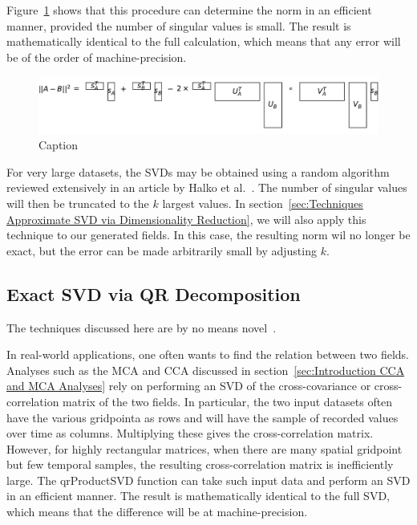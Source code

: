 \documentclass{acm_proc_article-sp}
\begin{document}
Figure~\ref{fig:normDifferenceFromUSVs} shows that this procedure can determine the norm in an efficient manner, provided the number of singular values is small. The result is mathematically identical to the full calculation, which means that any error will be of the order of machine-precision.

\begin{figure}[h]
\begin{center}
\includegraphics[width=\columnwidth]{Results/normDifferenceFromUSVs.pdf}
\caption[Small caption]{Caption}
\label{fig:normDifferenceFromUSVs}
\end{center}
\end{figure}
For very large datasets, the SVDs may be obtained using a random algorithm reviewed extensively in an article by Halko et al.~\cite{Halko2011}. The number of singular values will then be truncated to the $k$ largest values. In section~\ref{sec:Techniques Approximate SVD via Dimensionality Reduction}, we will also apply this technique to our generated fields. In this case, the resulting norm wil no longer be exact, but the error can be made arbitrarily small by adjusting $k$.

\subsection{Exact SVD via QR Decomposition}
\label{sec:Techniques Exact SVD via QR Decomposition}

The techniques discussed here are by no means novel~\cite{Golub1970, Bjorck1973, Chan1982, Tygert2017}.

In real-world applications, one often wants to find the relation between two fields. Analyses such as the MCA and CCA discussed in section~\ref{sec:Introduction CCA and MCA Analyses} rely on performing an SVD of the cross-covariance or cross-correlation matrix of the two fields. In particular, the two input datasets often have the various gridpointa as rows and will have the sample of recorded values over time as columns. Multiplying these gives the cross-correlation matrix. However, for highly rectangular matrices, when there are many spatial gridpoint but few temporal samples, the resulting cross-correlation matrix is inefficiently large. The qrProductSVD function can take such input data and perform an SVD in an efficient manner. The result is mathematically identical to the full SVD, which means that the difference will be at machine-precision.
\end{document}
